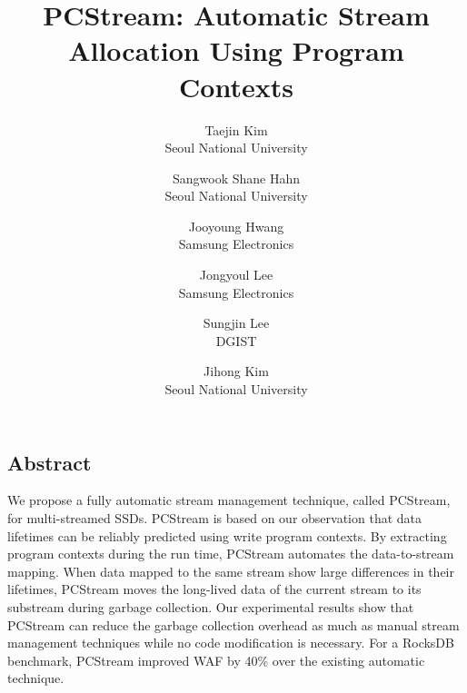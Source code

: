 \documentclass[letterpaper, twocolumn, 10pt]{article}
\begin{document}
\title{
\bf PCStream: Automatic Stream Allocation Using Program Contexts}


\author{
{\rm Taejin Kim}\\
Seoul National University
\and 
{\rm Sangwook Shane Hahn}\\
Seoul National University
\and 
{\rm Jooyoung Hwang} \\
Samsung Electronics
\and 
{\rm Jongyoul Lee} \\
Samsung Electronics
\and 
{\rm Sungjin Lee}\\
DGIST
\and 
{\rm Jihong Kim} \\
Seoul National University
}

\maketitle

\thispagestyle{empty}

\subsection*{Abstract}
We propose a fully automatic stream management technique, called {\sf PCStream}, 
for multi-streamed SSDs.
{\sf PCStream} is based on our observation that data lifetimes can be reliably predicted using
write program contexts.  
By extracting program contexts during the run time,  
{\sf PCStream}  automates the data-to-stream mapping.  
When data mapped to the same
stream show large differences in their lifetimes, {\sf PCStream}
moves the long-lived data of the current stream to 
its substream during garbage collection.
Our experimental results show that {\sf PCStream} can reduce the
garbage collection overhead as much as manual stream
management techniques while no code modification is necessary.
For a RocksDB benchmark, {\sf PCStream} improved WAF by 40\% over 
the existing automatic technique.








\end{document}
